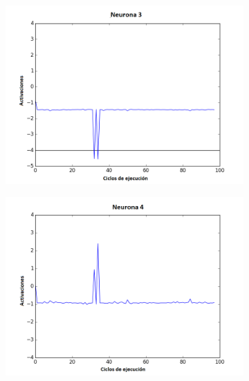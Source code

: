 \begin{figure}[!h]
\begin{subfigure}{0.33\textwidth}
\end{subfigure}\hfil %
\begin{subfigure}{0.33\textwidth}
  \includegraphics[width=\linewidth]{Imagenes/Agente1Activaciones/Agente0/Neurona2}
\end{subfigure}
\medskip
\begin{subfigure}{0.33\textwidth}
  \includegraphics[width=\linewidth]{Imagenes/Agente1Activaciones/Agente0/Neurona3}
\end{subfigure}\hfil %
\begin{subfigure}{0.33\textwidth}

\end{subfigure}
\end{figure}
